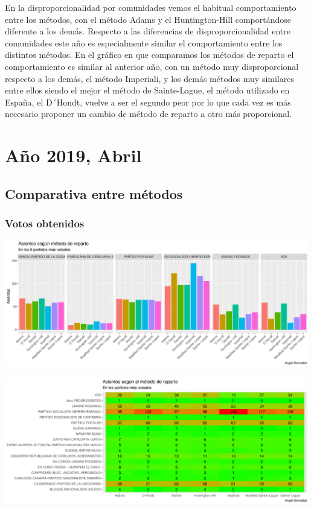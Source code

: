 \documentclass[12pt,a4paper,]{book}
\numberwithin{dummy}{section}
\theoremstyle{ocrenumbox}
\theoremstyle{blacknumex}
\theoremstyle{blacknumbox}
\theoremstyle{ocrenum}
\theoremstyle{ocrenum}
\begin{document}
En la disproporcionalidad por comunidades vemos el habitual
comportamiento entre los métodos, con el método Adams y el
Huntington-Hill comportándose diferente a los demás. Respecto a las
diferencias de disproporcionalidad entre comunidades este año es
especialmente similar el comportamiento entre los distintos métodos. En
el gráfico en que comparamos los métodos de reparto el comportamiento es
similar al anterior año, con un método muy disproporcional respecto a
los demás, el método Imperiali, y los demás métodos muy similares entre
ellos siendo el mejor el método de Sainte-Lague, el método utilizado en
España, el D´Hondt, vuelve a ser el segundo peor por lo que cada vez es
más necesario proponer un cambio de método de reparto a otro más
proporcional.

\hypertarget{auxf1o-2019-abril}{%
\section{Año 2019, Abril}\label{auxf1o-2019-abril}}

\hypertarget{comparativa-entre-muxe9todos-13}{%
\subsection{Comparativa entre
métodos}\label{comparativa-entre-muxe9todos-13}}

\hypertarget{votos-obtenidos-13}{%
\subsubsection{Votos obtenidos}\label{votos-obtenidos-13}}

\begin{center}\includegraphics[width=0.95\linewidth]{figurasR/unnamed-chunk-176-1} \end{center}

\begin{center}\includegraphics[width=0.95\linewidth]{figurasR/unnamed-chunk-176-2} \end{center}
\end{document}
